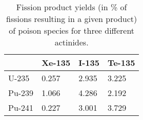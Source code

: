 \begin{table}[h]
\begin{tabularx}{\linewidth}{ |X|X|X|X| }
  \hline
  & \textbf{Xe-135} & \textbf{I-135} & \textbf{Te-135} \\
  \hline 
  U-235  & 0.257  & 2.935  & 3.225 \\
  \hline
  Pu-239 & 1.066 & 4.286 & 2.192 \\
   \hline
   Pu-241 & 0.227  &  3.001 & 3.729  \\
   \hline
\end{tabularx}
\caption{Fission product yields (in \% of fissions resulting in a given product) of poison species for three different actinides. \cite{JENDLFP}}
\label{tbl_fp}
\end{table}
